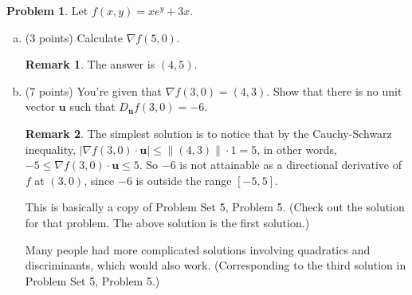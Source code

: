 \documentclass[11pt,oneside]{amsart}
\theoremstyle{definition}
\newtheorem{problem}{Problem}
\newtheorem*{remark}{Remark}
\theoremstyle{plain}
\newcommand{\bu}{{\mathbf{u}}}
\begin{document}
\begin{problem}
  Let $f(x,y)=xe^y+3x$.
  \begin{enumerate}[(a)]
    \item (3 points) Calculate $\nabla f(5,0)$.
    \begin{remark}\color{blue}
      The answer is $(4,5)$.
    \end{remark}
    \vfill
    \item (7 points) You're given that $\nabla f(3,0)=(4,3)$. Show that there is no unit vector $\bu$ such that $D_\bu f(3,0)=-6$.
    \begin{remark}\color{blue}
      The simplest solution is to notice that by the Cauchy-Schwarz inequality, $|\nabla f(3,0)\cdot \bu|\leq \|(4,3)\|\cdot1=5$, in other words, $-5\leq\nabla f(3,0)\cdot \bu\leq 5$. So $-6$ is not attainable as a directional derivative of $f$ at $(3,0)$, since $-6$ is outside the range $[-5,5]$.

      This is basically a copy of Problem Set 5, Problem 5. (Check out the solution for that problem. The above solution is the first solution.)

      Many people had more complicated solutions involving quadratics and discriminants, which would also work. (Corresponding to the third solution in Problem Set 5, Problem 5.)
    \end{remark}
    \vfill
    \vfill
    \vfill
  \end{enumerate}
\end{problem}

\newpage
\end{document}
